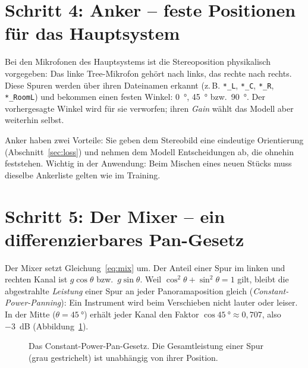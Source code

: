 \documentclass[11pt,a4paper]{article}
\begin{document}
\section{Schritt 4: Anker -- feste Positionen für das Hauptsystem}

Bei den Mikrofonen des Hauptsystems ist die Stereoposition physikalisch
vorgegeben: Das linke Tree-Mikrofon gehört nach links, das rechte nach rechts.
Diese Spuren werden über ihren Dateinamen erkannt (z.\,B. \texttt{*\_L},
\texttt{*\_C}, \texttt{*\_R}, \texttt{*\_RoomL}) und bekommen einen festen
Winkel: \SI{0}{\degree}, \SI{45}{\degree} bzw.\ \SI{90}{\degree}. Der
vorhergesagte Winkel wird für sie verworfen; ihren \emph{Gain} wählt das Modell
aber weiterhin selbst.

Anker haben zwei Vorteile: Sie geben dem Stereobild eine eindeutige
Orientierung (Abschnitt~\ref{sec:loss}) und nehmen dem Modell Entscheidungen ab,
die ohnehin feststehen. Wichtig in der Anwendung: Beim Mischen eines neuen
Stücks muss dieselbe Ankerliste gelten wie im Training.

\section{Schritt 5: Der Mixer -- ein differenzierbares Pan-Gesetz}
\label{sec:mixer}

Der Mixer setzt Gleichung~\eqref{eq:mix} um. Der Anteil einer Spur im linken
und rechten Kanal ist $g\cos\theta$ bzw.\ $g\sin\theta$. Weil
$\cos^2\theta + \sin^2\theta = 1$ gilt, bleibt die abgestrahlte
\emph{Leistung} einer Spur an jeder Panoramaposition gleich
(\emph{Constant-Power-Panning}): Ein Instrument wird beim Verschieben nicht
lauter oder leiser. In der Mitte ($\theta=\SI{45}{\degree}$) erhält jeder Kanal
den Faktor $\cos\SI{45}{\degree} \approx 0{,}707$, also \SI{-3}{dB}
(Abbildung~\ref{fig:panlaw}).

\begin{figure}[h]
\centering
{}
\caption{Das Constant-Power-Pan-Gesetz. Die Gesamtleistung einer Spur (grau
gestrichelt) ist unabhängig von ihrer Position.}
\label{fig:panlaw}
\end{figure}
\end{document}
